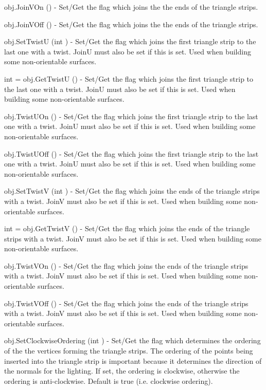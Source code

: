\begin{DoxyItemize}
\item {\ttfamily obj.\-Join\-V\-On ()} -\/ Set/\-Get the flag which joins the the ends of the triangle strips.  
\item {\ttfamily obj.\-Join\-V\-Off ()} -\/ Set/\-Get the flag which joins the the ends of the triangle strips.  
\item {\ttfamily obj.\-Set\-Twist\-U (int )} -\/ Set/\-Get the flag which joins the first triangle strip to the last one with a twist. Join\-U must also be set if this is set. Used when building some non-\/orientable surfaces.  
\item {\ttfamily int = obj.\-Get\-Twist\-U ()} -\/ Set/\-Get the flag which joins the first triangle strip to the last one with a twist. Join\-U must also be set if this is set. Used when building some non-\/orientable surfaces.  
\item {\ttfamily obj.\-Twist\-U\-On ()} -\/ Set/\-Get the flag which joins the first triangle strip to the last one with a twist. Join\-U must also be set if this is set. Used when building some non-\/orientable surfaces.  
\item {\ttfamily obj.\-Twist\-U\-Off ()} -\/ Set/\-Get the flag which joins the first triangle strip to the last one with a twist. Join\-U must also be set if this is set. Used when building some non-\/orientable surfaces.  
\item {\ttfamily obj.\-Set\-Twist\-V (int )} -\/ Set/\-Get the flag which joins the ends of the triangle strips with a twist. Join\-V must also be set if this is set. Used when building some non-\/orientable surfaces.  
\item {\ttfamily int = obj.\-Get\-Twist\-V ()} -\/ Set/\-Get the flag which joins the ends of the triangle strips with a twist. Join\-V must also be set if this is set. Used when building some non-\/orientable surfaces.  
\item {\ttfamily obj.\-Twist\-V\-On ()} -\/ Set/\-Get the flag which joins the ends of the triangle strips with a twist. Join\-V must also be set if this is set. Used when building some non-\/orientable surfaces.  
\item {\ttfamily obj.\-Twist\-V\-Off ()} -\/ Set/\-Get the flag which joins the ends of the triangle strips with a twist. Join\-V must also be set if this is set. Used when building some non-\/orientable surfaces.  
\item {\ttfamily obj.\-Set\-Clockwise\-Ordering (int )} -\/ Set/\-Get the flag which determines the ordering of the the vertices forming the triangle strips. The ordering of the points being inserted into the triangle strip is important because it determines the direction of the normals for the lighting. If set, the ordering is clockwise, otherwise the ordering is anti-\/clockwise. Default is true (i.\-e. clockwise ordering).  

\end{DoxyItemize}
